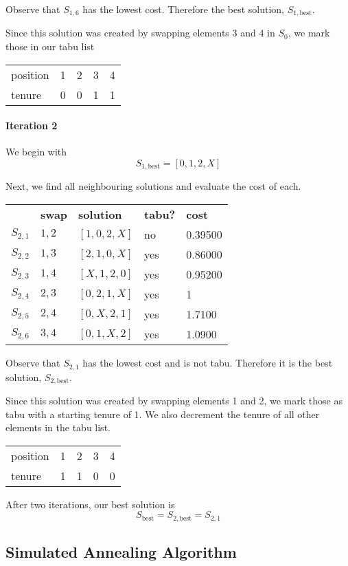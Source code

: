 \documentclass[a4paper]{article}
\newcommand{\subsubsubsection}[1]{\paragraph{#1} \mbox{}}
\begin{document}
Observe that $S_{1,6}$ has the lowest cost. Therefore the best solution, $S_{1, \text{best}}$.

Since this solution was created by swapping elements 3 and 4 in $S_0$, we mark those in our tabu list

\begin{tabular}{lllll}
position & 1 & 2 & 3 & 4 \\
tenure   & 0 & 0 & 1 & 1
\end{tabular}
\vspace{1.5em}

\subsubsubsection{Iteration 2}

We begin with $$S_{1, \text{best}} = [0, 1, 2, X]$$

Next, we find all neighbouring solutions and evaluate the cost of each.

\begin{tabular}{lllll}
& \textbf{swap}   & \textbf{solution}    & \textbf{tabu?} & \textbf{cost}  \\

$S_{2,1}$ & $1,2$ & $[1, 0, 2, X]$ & no  & 0.39500 \\
$S_{2,2}$ & $1,3$ & $[2, 1, 0, X]$ & yes & 0.86000 \\
$S_{2,3}$ & $1,4$ & $[X, 1, 2, 0]$ & yes & 0.95200 \\
$S_{2,4}$ & $2,3$ & $[0, 2, 1, X]$ & yes & 1       \\
$S_{2,5}$ & $2,4$ & $[0, X, 2, 1]$ & yes & 1.7100  \\
$S_{2,6}$ & $3,4$ & $[0, 1, X, 2]$ & yes & 1.0900  \\
\end{tabular}

Observe that $S_{2,1}$ has the lowest cost and is not tabu. Therefore it is the best solution, $S_{2, \text{best}}$.

Since this solution was created by swapping elements 1 and 2, we mark those as tabu with a starting tenure of 1. We also decrement the tenure of all other elements in the tabu list.

\begin{tabular}{lllll}
position & 1 & 2 & 3 & 4 \\
tenure   & 1 & 1 & 0 & 0
\end{tabular}
\vspace{1.5em}

After two iterations, our best solution is
$$S_{\text{best}} = S_{2, \text{best}} = S_{2,1}$$

\subsection{Simulated Annealing Algorithm} %
\end{document}
